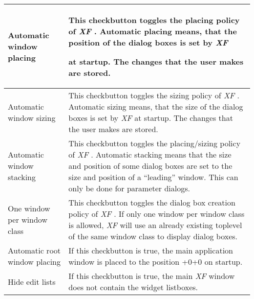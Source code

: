 {\newpage
\clearpage
\samepage \begin{supertabular}{|l|p{5.5cm}|}
Automatic window placing      & This checkbutton toggles the
                                placing policy of {\em XF}
.
                                Automatic placing means,
                                that the position of the
                                dialog boxes is set by {\em XF }

                                at startup. The changes that
                                the user makes are stored.\\  \hline
Automatic window sizing       & This checkbutton toggles the
                                sizing policy of {\em XF}
.
                                Automatic sizing means,
                                that the size of the dialog
                                boxes is set by {\em XF }
 at
                                startup. The changes that 
                                the user makes are stored.\\  \hline
Automatic window stacking     & This checkbutton toggles the
                                placing/sizing policy of
                                {\em XF}
. Automatic stacking means
                                that the size and position
                                of some dialog boxes are set
                                to the size and position of
                                a ``leading'' window. This
                                can only be done for
                                parameter dialogs.\\  \hline
One window per window class   & This checkbutton toggles the
                                dialog box creation policy
                                of {\em XF}
. If only one window
                                per window class is allowed,
                                {\em XF }
 will use an already
                                existing toplevel of the
                                same window class to display
                                dialog boxes.\\  \hline
Automatic root window placing & If this checkbutton is true,
                                the main application window
                                is placed to the position
                                +0+0 on startup.\\  \hline
Hide edit lists               & If this checkbutton is true,
                                the main {\em XF }
 window does not
                                contain the widget listboxes.\\  \hline

\end{supertabular}}
